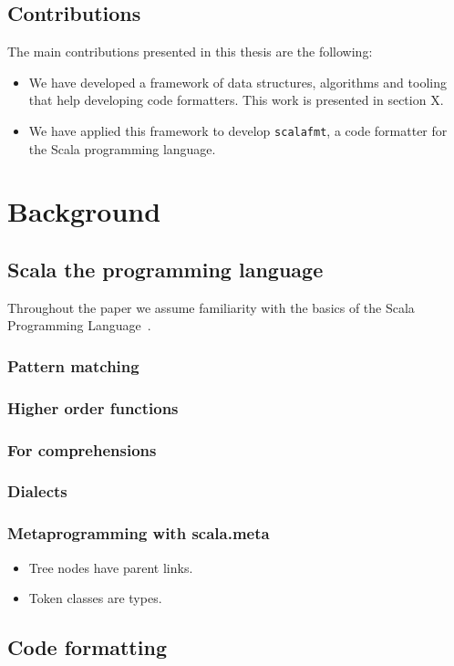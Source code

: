 \documentclass[11pt,a4paper]{article}
\begin{document}
\subsection{Contributions}
The main contributions presented in this thesis are the following:
\begin{itemize}
    \item We have developed a framework of data structures, algorithms and tooling that help
      developing code formatters. This work is presented in section X.
    \item We have applied this framework to develop \texttt{scalafmt}, a code
      formatter for the Scala programming language.
\end{itemize}

\section{Background}
\subsection{Scala the programming language}
Throughout the paper we assume familiarity with the basics of the Scala
Programming Language~\autocite{odersky_scala_2004}.
\subsubsection{Pattern matching}
\subsubsection{Higher order functions}
\subsubsection{For comprehensions}
\subsubsection{Dialects}
\subsubsection{Metaprogramming with scala.meta}
\begin{itemize}
  \item Tree nodes have parent links.
  \item Token classes are types.
\end{itemize}
\subsection{Code formatting}
\end{document}
